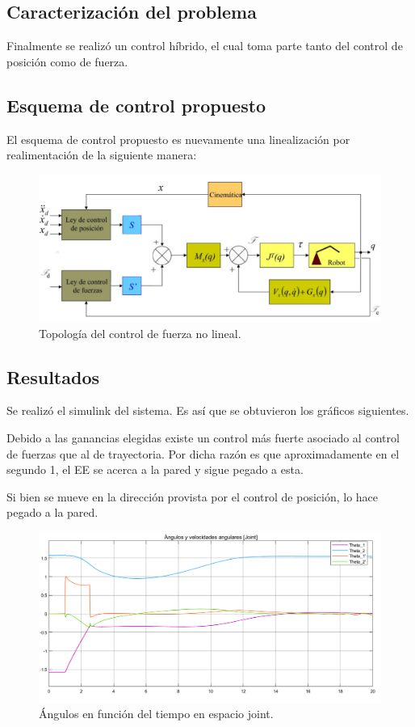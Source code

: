 %

%

\subsection{Caracterización del problema}
Finalmente se realizó un control híbrido, el cual toma parte tanto del control de posición como de fuerza.

\subsection{Esquema de control propuesto}
El esquema de control propuesto es nuevamente una linealización por realimentación de la siguiente manera:
\begin{figure}[H]
	\centering
	\includegraphics[width=0.8\linewidth]{ImagenesControl híbrido no lineal/controlh}
	\caption{Topología del control de fuerza no lineal.}	
	\label{fig:control_f_modelo_h}
\end{figure}


\subsection{Resultados}
Se realizó el simulink del sistema. Es así que se obtuvieron los gráficos siguientes.

Debido a las ganancias elegidas existe un control más fuerte asociado al control de fuerzas que al de trayectoria. Por dicha razón es que aproximadamente en el segundo 1, el EE se acerca a la pared y sigue pegado a esta.

Si bien se mueve en la dirección provista por el control de posición, lo hace pegado a la pared.
\begin{figure}[H]
	\centering
	\includegraphics[width=0.8\linewidth]{ImagenesControl híbrido no lineal/3_3_a}
	\caption{Ángulos en función del tiempo en espacio joint.}	
	\label{fig:cthetas}
\end{figure}

